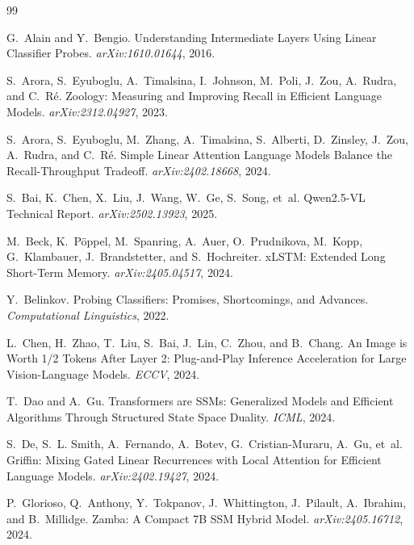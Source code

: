 \documentclass{article}
\begin{document}

\begin{thebibliography}{99}\small\setlength{\itemsep}{1pt}

G.~Alain and Y.~Bengio.
\newblock Understanding Intermediate Layers Using Linear Classifier Probes.
\emph{arXiv:1610.01644}, 2016.

S.~Arora, S.~Eyuboglu, A.~Timalsina, I.~Johnson, M.~Poli, J.~Zou, A.~Rudra,
and C.~R\'e.
\newblock Zoology: Measuring and Improving Recall in Efficient Language Models.
\emph{arXiv:2312.04927}, 2023.

S.~Arora, S.~Eyuboglu, M.~Zhang, A.~Timalsina, S.~Alberti, D.~Zinsley, J.~Zou,
A.~Rudra, and C.~R\'e.
\newblock Simple Linear Attention Language Models Balance the Recall-Throughput
Tradeoff. \emph{arXiv:2402.18668}, 2024.

S.~Bai, K.~Chen, X.~Liu, J.~Wang, W.~Ge, S.~Song, et~al.
\newblock Qwen2.5-VL Technical Report. \emph{arXiv:2502.13923}, 2025.

M.~Beck, K.~P\"oppel, M.~Spanring, A.~Auer, O.~Prudnikova, M.~Kopp,
G.~Klambauer, J.~Brandstetter, and S.~Hochreiter.
\newblock xLSTM: Extended Long Short-Term Memory.
\emph{arXiv:2405.04517}, 2024.

Y.~Belinkov.
\newblock Probing Classifiers: Promises, Shortcomings, and Advances.
\emph{Computational Linguistics}, 2022.

L.~Chen, H.~Zhao, T.~Liu, S.~Bai, J.~Lin, C.~Zhou, and B.~Chang.
\newblock An Image is Worth 1/2 Tokens After Layer 2: Plug-and-Play Inference
Acceleration for Large Vision-Language Models. \emph{ECCV}, 2024.

T.~Dao and A.~Gu.
\newblock Transformers are SSMs: Generalized Models and Efficient Algorithms
Through Structured State Space Duality. \emph{ICML}, 2024.

S.~De, S.~L. Smith, A.~Fernando, A.~Botev, G.~Cristian-Muraru, A.~Gu, et~al.
\newblock Griffin: Mixing Gated Linear Recurrences with Local Attention for
Efficient Language Models. \emph{arXiv:2402.19427}, 2024.

P.~Glorioso, Q.~Anthony, Y.~Tokpanov, J.~Whittington, J.~Pilault, A.~Ibrahim,
and B.~Millidge.
\newblock Zamba: A Compact 7B SSM Hybrid Model.
\emph{arXiv:2405.16712}, 2024.


\end{thebibliography}
\end{document}
